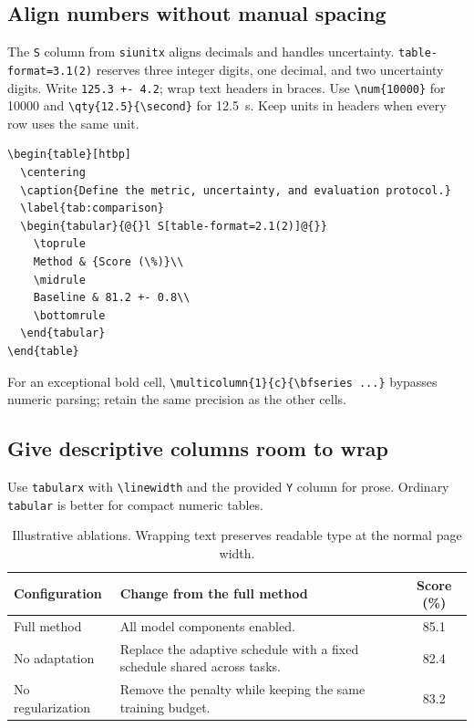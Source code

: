\documentclass[11pt]{article}
\begin{document}
\subsection{Align numbers without manual spacing}
The \texttt{S} column from \texttt{siunitx} aligns decimals and handles uncertainty.
\verb|table-format=3.1(2)| reserves three integer digits, one decimal, and two
uncertainty digits. Write \verb|125.3 +- 4.2|; wrap text headers in braces.
Use \verb|\num{10000}| for \num{10000} and \verb|\qty{12.5}{\second}| for
\qty{12.5}{\second}. Keep units in headers when every row uses the same unit.
\begin{lstlisting}
\begin{table}[htbp]
  \centering
  \caption{Define the metric, uncertainty, and evaluation protocol.}
  \label{tab:comparison}
  \begin{tabular}{@{}l S[table-format=2.1(2)]@{}}
    \toprule
    Method & {Score (\%)}\\
    \midrule
    Baseline & 81.2 +- 0.8\\
    \bottomrule
  \end{tabular}
\end{table}
\end{lstlisting}
For an exceptional bold cell, \verb|\multicolumn{1}{c}{\bfseries ...}|
bypasses numeric parsing; retain the same precision as the other cells.

\subsection{Give descriptive columns room to wrap}
Use \texttt{tabularx} with \verb|\linewidth| and the provided \texttt{Y} column
for prose. Ordinary \texttt{tabular} is better for compact numeric tables.
\begin{table}[htbp]
\caption{Illustrative ablations. Wrapping text preserves readable type at the normal page width.}
\label{tab:ablations}
\begin{tabularx}{\linewidth}{@{}lY S[table-format=2.1]@{}}
\toprule
Configuration & Change from the full method & {Score (\%)}\\
\midrule
Full method & All model components enabled. & 85.1\\
No adaptation & Replace the adaptive schedule with a fixed schedule shared across tasks. & 82.4\\
No regularization & Remove the penalty while keeping the same training budget. & 83.2\\
\bottomrule
\end{tabularx}
\end{table}
\end{document}
